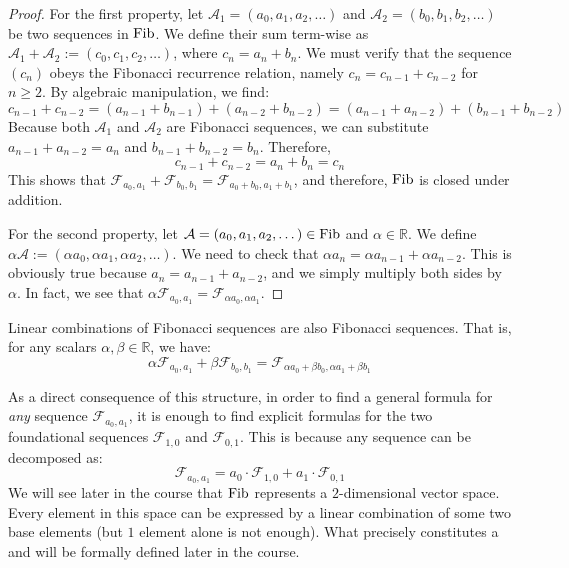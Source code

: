 \begin{proof}
For the first property, let $\mathcal{A}_1 = (a_0, a_1, a_2, \dots)$ and $\mathcal{A}_2 = (b_0, b_1, b_2, \dots)$ be two sequences in $\operatorname{Fib}$. We define their sum term-wise as $\mathcal{A}_1 + \mathcal{A}_2 := (c_0, c_1, c_2, \dots)$, where $c_n = a_n + b_n$. We must verify that the sequence $(c_n)$ obeys the Fibonacci recurrence relation, namely $c_n = c_{n-1} + c_{n-2}$ for $n \ge 2$. By algebraic manipulation, we find:
\[
c_{n-1} + c_{n-2} = (a_{n-1} + b_{n-1}) + (a_{n-2} + b_{n-2}) = (a_{n-1} + a_{n-2}) + (b_{n-1} + b_{n-2})
\]
Because both $\mathcal{A}_1$ and $\mathcal{A}_2$ are Fibonacci sequences, we can substitute $a_{n-1} + a_{n-2} = a_n$ and $b_{n-1} + b_{n-2} = b_n$. Therefore,
\[
c_{n-1} + c_{n-2} = a_n + b_n = c_n
\]
This shows that $\mathcal{F}_{a_0, a_1} + \mathcal{F}_{b_0, b_1} = \mathcal{F}_{a_0 + b_0, a_1 + b_1}$, and therefore, $\operatorname{Fib}$ is closed under addition.

For the second property, let $\mathcal{A} = (a_0, a_1, a_2, \dots) \in \operatorname{Fib}$ and $\alpha \in \mathbb{R}$. We define $\alpha \mathcal{A} := (\alpha a_0, \alpha a_1, \alpha a_2, \dots)$. We need to check that $\alpha a_n = \alpha a_{n-1} + \alpha a_{n-2}$. This is obviously true because $a_n = a_{n-1} + a_{n-2}$, and we simply multiply both sides by $\alpha$. In fact, we see that $\alpha \mathcal{F}_{a_0, a_1} = \mathcal{F}_{\alpha a_0, \alpha a_1}$.
\end{proof}

\begin{corollary}
Linear combinations of Fibonacci sequences are also Fibonacci sequences. That is, for any scalars $\alpha, \beta \in \mathbb{R}$, we have:
\[
\alpha \mathcal{F}_{a_0, a_1} + \beta \mathcal{F}_{b_0, b_1} = \mathcal{F}_{\alpha a_0 + \beta b_0, \alpha a_1 + \beta b_1}
\]
\end{corollary}

\begin{remark}
As a direct consequence of this structure, in order to find a general formula for \textit{any} sequence $\mathcal{F}_{a_0, a_1}$, it is enough to find explicit formulas for the two foundational sequences $\mathcal{F}_{1,0}$ and $\mathcal{F}_{0,1}$. This is because any sequence can be decomposed as:
\[
\mathcal{F}_{a_0, a_1} = a_0 \cdot \mathcal{F}_{1,0} + a_1 \cdot \mathcal{F}_{0,1}
\]
We will see later in the course that $\operatorname{Fib}$ represents a $2$-dimensional vector space. Every element in this space can be expressed by a linear combination of some two base elements (but $1$ element alone is not enough). What precisely constitutes a  and  will be formally defined later in the course.
\end{remark}


